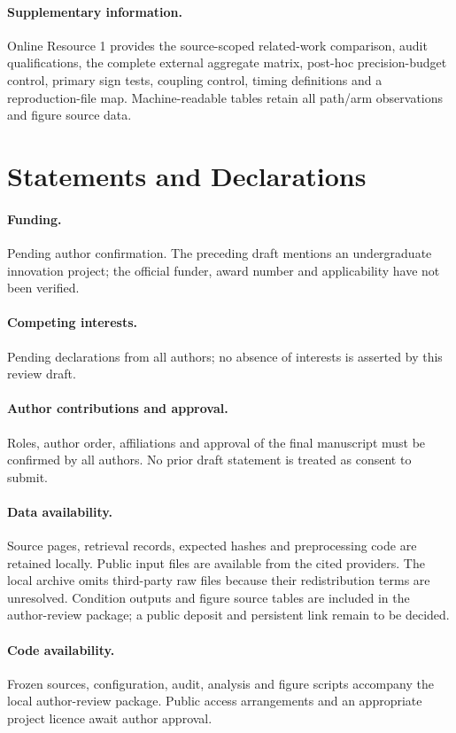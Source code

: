 \documentclass[smallextended]{svjour3}
\begin{document}
\paragraph{Supplementary information.} Online Resource 1 provides the source-scoped related-work comparison, audit qualifications, the complete external aggregate matrix, post-hoc precision-budget control, primary sign tests, coupling control, timing definitions and a reproduction-file map. Machine-readable tables retain all path/arm observations and figure source data.
\section*{Statements and Declarations}
\paragraph{Funding.} Pending author confirmation. The preceding draft mentions an undergraduate innovation project; the official funder, award number and applicability have not been verified.
\paragraph{Competing interests.} Pending declarations from all authors; no absence of interests is asserted by this review draft.
\paragraph{Author contributions and approval.} Roles, author order, affiliations and approval of the final manuscript must be confirmed by all authors. No prior draft statement is treated as consent to submit.
\paragraph{Data availability.} Source pages, retrieval records, expected hashes and preprocessing code are retained locally. Public input files are available from the cited providers. The local archive omits third-party raw files because their redistribution terms are unresolved. Condition outputs and figure source tables are included in the author-review package; a public deposit and persistent link remain to be decided.
\paragraph{Code availability.} Frozen sources, configuration, audit, analysis and figure scripts accompany the local author-review package. Public access arrangements and an appropriate project licence await author approval.

\end{document}
